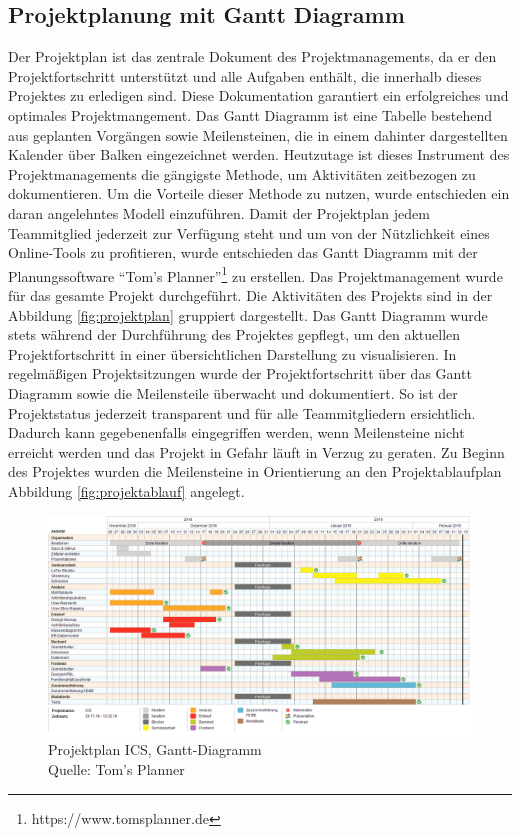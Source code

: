 	\subsection{Projektplanung mit Gantt Diagramm}
	Der Projektplan ist das zentrale Dokument des Projektmanagements, da er den Projektfortschritt unterstützt und alle Aufgaben enthält, die innerhalb dieses Projektes zu erledigen sind. Diese Dokumentation garantiert ein erfolgreiches und optimales Projektmangement. Das Gantt Diagramm ist eine Tabelle bestehend aus geplanten Vorgängen sowie Meilensteinen, die in einem dahinter dargestellten Kalender über Balken eingezeichnet werden\autocite[Vgl.][S. 107]{projektmanagement}. Heutzutage ist dieses Instrument des Projektmanagements die gängigste Methode, um Aktivitäten zeitbezogen zu dokumentieren. Um die Vorteile dieser Methode zu nutzen, wurde entschieden ein daran angelehntes Modell einzuführen. Damit der Projektplan jedem Teammitglied jederzeit zur Verfügung steht und um von der Nützlichkeit eines Online-Tools zu profitieren, wurde entschieden das Gantt Diagramm mit der  Planungssoftware \enquote{Tom's Planner}\footnote{https://www.tomsplanner.de} zu erstellen.
	Das Projektmanagement wurde für das gesamte Projekt durchgeführt. Die Aktivitäten des Projekts sind in der Abbildung \vref{fig:projektplan} gruppiert dargestellt. Das Gantt Diagramm wurde stets während der Durchführung des Projektes gepflegt, um den aktuellen Projektfortschritt in einer übersichtlichen Darstellung zu visualisieren. In regelmäßigen Projektsitzungen wurde der Projektfortschritt über das Gantt Diagramm sowie die Meilensteile überwacht und dokumentiert. So ist der Projektstatus jederzeit transparent und für alle Teammitgliedern ersichtlich. Dadurch kann gegebenenfalls eingegriffen werden, wenn Meilensteine nicht erreicht werden und das Projekt in Gefahr läuft in Verzug zu geraten.  
	 Zu Beginn des Projektes wurden die Meilensteine in Orientierung an den Projektablaufplan Abbildung \vref{fig:projektablauf} angelegt. 
	\begin{figure}[H]
		\centering 
		\includegraphics[width=14cm]{img/projektplan.png}
		\captionsetup{format=hang}
		\caption[Projektplan]{\label{fig:projektplan} Projektplan ICS, Gantt-Diagramm \\ Quelle: Tom's Planner}
	\end{figure}
